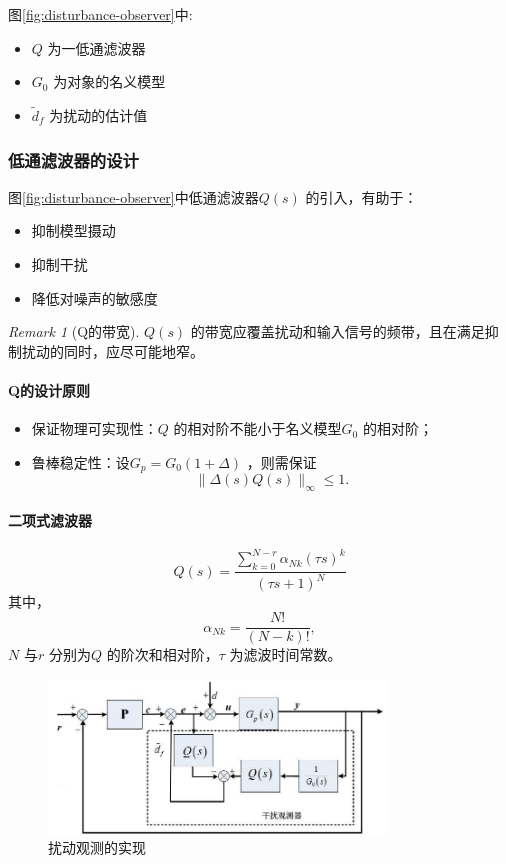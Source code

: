 \documentclass[14pt,a4paper]{article}
\theoremstyle{plain}
\theoremstyle{definition}
\theoremstyle{remark}
\newtheorem{rmk}{Remark}[section]
\theoremstyle{plain}
\theoremstyle{plain}
\theoremstyle{definition}
\begin{document}
			图\ref{fig:disturbance-observer}中:
			\begin{itemize}
				\item $Q$ 为一低通滤波器
				\item $G_0$ 为对象的名义模型
				\item $\tilde d_f$ 为扰动的估计值
			\end{itemize} 

			\subsubsection{低通滤波器的设计}%
			\label{ssub:低通滤波器的设计}
				
			图\ref{fig:disturbance-observer}中低通滤波器$Q(s)$ 的引入，有助于：
			\begin{itemize}
				\item 抑制模型摄动
				\item 抑制干扰
				\item 降低对噪声的敏感度
			\end{itemize} 

			\begin{rmk}[Q的带宽]  
			\label{rmk:q的带宽}
				$Q(s)$ 的带宽应覆盖扰动和输入信号的频带，且在满足抑制扰动的同时，应尽可能地窄。
			\end{rmk} 

			\paragraph{Q的设计原则}%
			\label{par:q的设计原则}
			
				\begin{itemize}
					\item 保证物理可实现性：$Q$ 的相对阶不能小于名义模型$G_0$ 的相对阶；   
					\item 鲁棒稳定性：设$G_p = G_0\left( 1+\Delta  \right) $ ，则需保证
						\[
							\|\Delta(s) Q(s)\|_{\infty} \le 1
						.\] 
				\end{itemize}  

			\paragraph{二项式滤波器}%
			\label{par:二项式滤波器}
			
				\begin{equation}
				\label{eq:LPF}
				Q(s) = \dfrac{\sum\limits_{k=0}^{N-r} \alpha_{Nk}\left(\tau s \right)^{k}}{\left( \tau s+1 \right)^{N}} 
				\end{equation} 
				其中，
				\[
				\alpha_{Nk} = \dfrac{N!}{\left( N-k \right) !} 
				,\] 
				$N$ 与$r$ 分别为$Q$ 的阶次和相对阶，$\tau$ 为滤波时间常数。

			\begin{figure}[H]
				\centering
				\includegraphics[width=0.8\textwidth]{./figures/do1.jpg} 
				\caption{扰动观测的实现}
				\label{fig:do}
			\end{figure}
\end{document}
